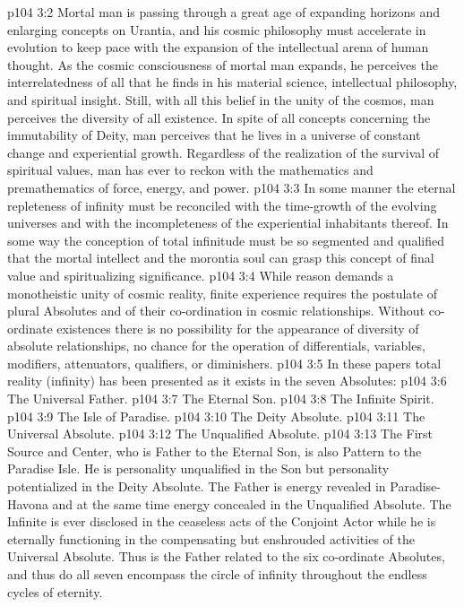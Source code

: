 \vs p104 3:2 Mortal man is passing through a great age of expanding horizons and enlarging concepts on Urantia, and his cosmic philosophy must accelerate in evolution to keep pace with the expansion of the intellectual arena of human thought. As the cosmic consciousness of mortal man expands, he perceives the interrelatedness of all that he finds in his material science, intellectual philosophy, and spiritual insight. Still, with all this belief in the unity of the cosmos, man perceives the diversity of all existence. In spite of all concepts concerning the immutability of Deity, man perceives that he lives in a universe of constant change and experiential growth. Regardless of the realization of the survival of spiritual values, man has ever to reckon with the mathematics and premathematics of force, energy, and power.
\vs p104 3:3 In some manner the eternal repleteness of infinity must be reconciled with the time\hyp{}growth of the evolving universes and with the incompleteness of the experiential inhabitants thereof. In some way the conception of total infinitude must be so segmented and qualified that the mortal intellect and the morontia soul can grasp this concept of final value and spiritualizing significance.
\vs p104 3:4 While reason demands a monotheistic unity of cosmic reality, finite experience requires the postulate of plural Absolutes and of their co\hyp{}ordination in cosmic relationships. Without co\hyp{}ordinate existences there is no possibility for the appearance of diversity of absolute relationships, no chance for the operation of differentials, variables, modifiers, attenuators, qualifiers, or diminishers.
\vs p104 3:5 \pc In these papers total reality (infinity) has been presented as it exists in the seven Absolutes:
\vs p104 3:6 \bibnobreakspace The Universal Father.
\vs p104 3:7 \bibnobreakspace The Eternal Son.
\vs p104 3:8 \bibnobreakspace The Infinite Spirit.
\vs p104 3:9 \bibnobreakspace The Isle of Paradise.
\vs p104 3:10 \bibnobreakspace The Deity Absolute.
\vs p104 3:11 \bibnobreakspace The Universal Absolute.
\vs p104 3:12 \bibnobreakspace The Unqualified Absolute.
\vs p104 3:13 \pc The First Source and Center, who is Father to the Eternal Son, is also Pattern to the Paradise Isle. He is personality unqualified in the Son but personality potentialized in the Deity Absolute. The Father is energy revealed in Paradise\hyp{}Havona and at the same time energy concealed in the Unqualified Absolute. The Infinite is ever disclosed in the ceaseless acts of the Conjoint Actor while he is eternally functioning in the compensating but enshrouded activities of the Universal Absolute. Thus is the Father related to the six co\hyp{}ordinate Absolutes, and thus do all seven encompass the circle of infinity throughout the endless cycles of eternity.
